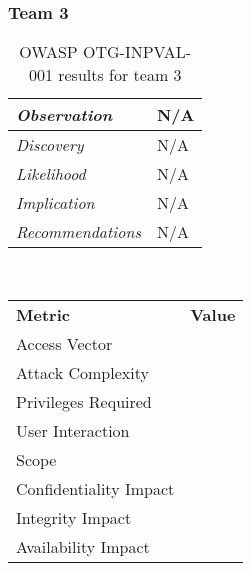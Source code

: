 \documentclass[headsepline,footsepline,footinclude=false,oneside,fontsize=11pt,paper=a4,listof=totoc,bibliography=totoc]{scrbook} %
\begin{document}
\subsubsection{Team 3}

\begin{table}[H]
	\centering
	\begin{tabular}{l p{11cm}} 
		\textit{Observation} &  N/A\\ 
		\hline
		\textit{Discovery} &  N/A \\
		\hline
		\textit{Likelihood} & N/A\\
		\hline
		\textit{Implication} & N/A\\
		\hline
		\textit{Recommendations} & N/A\\ 
	\end{tabular}
	\caption{OWASP OTG-INPVAL-001 results for team 3}
	\label{table:scenario2}
\end{table} 
\
\vspace{0.5cm}
\
\begin{center}
	\begin{tabular}{ll}
		\rowcolor[HTML]{34CDF9} 
		{\color[HTML]{ECF4FF} \textbf{Metric}}        & {\color[HTML]{ECF4FF} \textbf{Value}} \\
		\rowcolor[HTML]{BBDAFF} 
		{\color[HTML]{333333} Access Vector}          & {\color[HTML]{333333} }               \\
		\rowcolor[HTML]{ECF4FF} 
		{\color[HTML]{333333} Attack Complexity}      & {\color[HTML]{333333} }               \\
		\rowcolor[HTML]{BBDAFF} 
		{\color[HTML]{333333} Privileges Required}    & {\color[HTML]{333333} }               \\
		\rowcolor[HTML]{ECF4FF} 
		{\color[HTML]{333333} User Interaction}       & {\color[HTML]{333333} }               \\
		\rowcolor[HTML]{BBDAFF} 
		{\color[HTML]{333333} Scope}                  & {\color[HTML]{333333} }               \\
		\rowcolor[HTML]{ECF4FF} 
		{\color[HTML]{333333} Confidentiality Impact} & {\color[HTML]{333333} }               \\
		\rowcolor[HTML]{BBDAFF} 
		{\color[HTML]{333333} Integrity Impact}       & {\color[HTML]{333333} }               \\
		\rowcolor[HTML]{ECF4FF} 
		{\color[HTML]{333333} Availability Impact}    & {\color[HTML]{333333} }              
	\end{tabular}
\end{center}
\end{document}
